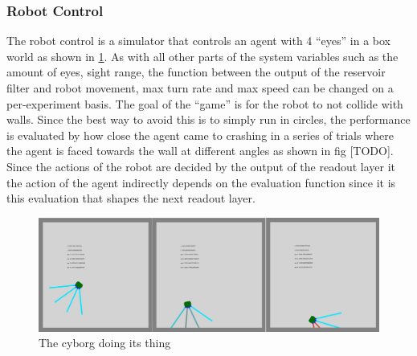 \subsubsection{Robot Control}
The robot control is a simulator that controls an agent with 4 ``eyes'' in a box
world as shown in \ref{figGame}.
As with all other parts of the system variables such as the amount of eyes, sight
range, the function between the output of the reservoir filter and robot
movement, max turn rate and max speed can be changed on a per-experiment basis.
The goal of the ``game'' is for the robot to not collide with walls.
Since the best way to avoid this is to simply run in circles, the performance is
evaluated by how close the agent came to crashing in a series of trials where
the agent is faced towards the wall at different angles as shown in fig [TODO].
Since the actions of the robot are decided by the output of the readout layer it
the action of the agent indirectly depends on the evaluation function since it
is this evaluation that shapes the next readout layer.
\begin{figure}[h!]
  \centering
  \includegraphics[width=1\textwidth]{fig/TAC/game2.png}
  \caption{The cyborg doing its thing}
  \label{figGame}
\end{figure}
